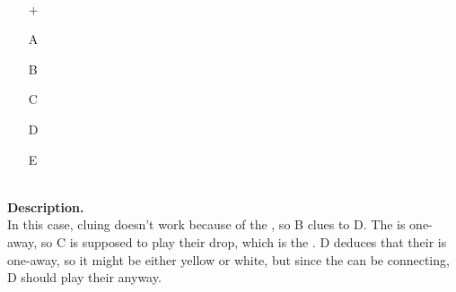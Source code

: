 \begin{example}	\hfill \\
	\begin{minipage}{0.45\textwidth}
		\begin{itemize}
			\item[\Large +]      
			\item[\Large A]    
			\item[\Large B]    
			\item[\Large C]    
			\item[\Large D]    
			\item[\Large E]    
		\end{itemize}
	\end{minipage}%
	\begin{minipage}{0.55\textwidth}
		\hfill \\
		
		\textbf{Description.} \\
		
		In this case, cluing  doesn't work because of the , so B clues  to D. The  is one-away, so C is supposed to play their drop, which is the . D deduces that their  is one-away, so it might be either yellow or white, but since the  can be connecting, D should play their  anyway.
	\end{minipage}
\end{example} \vspace{0.15 cm}

